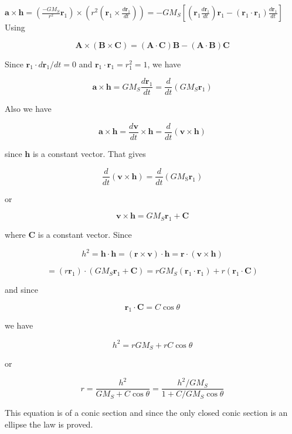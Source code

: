 \documentclass[10pt]{article}
\begin{document}
$\mathbf{a} \times \mathbf{h}=\left(\frac{-G M_{S}}{r^{2}} \mathbf{r}_{1}\right) \times\left(r^{2}\left(\mathbf{r}_{1} \times \frac{d \mathbf{r}_{1}}{d t}\right)\right)=-G M_{S}\left[\left(\mathbf{r}_{1} \frac{d \mathbf{r}_{1}}{d t}\right) \mathbf{r}_{1}-\left(\mathbf{r}_{1} \cdot \mathbf{r}_{1}\right) \frac{d \mathbf{r}_{1}}{d t}\right]$\\
Using

$$
\mathbf{A} \times(\mathbf{B} \times \mathbf{C})=(\mathbf{A} \cdot \mathbf{C}) \mathbf{B}-(\mathbf{A} \cdot \mathbf{B}) \mathbf{C}
$$

Since $\mathbf{r}_{1} \cdot d \mathbf{r}_{1} / d t=0$ and $\mathbf{r}_{1} \cdot \mathbf{r}_{1}=r_{1}^{2}=1$, we have

$$
\mathbf{a} \times \mathbf{h}=G M_{S} \frac{d \mathbf{r}_{1}}{d t}=\frac{d}{d t}\left(G M_{S} \mathbf{r}_{1}\right)
$$

Also we have

$$
\mathbf{a} \times \mathbf{h}=\frac{d \mathbf{v}}{d t} \times \mathbf{h}=\frac{d}{d t}(\mathbf{v} \times \mathbf{h})
$$

since $\mathbf{h}$ is a constant vector. That gives

$$
\frac{d}{d t}(\mathbf{v} \times \mathbf{h})=\frac{d}{d t}\left(G M_{\mathrm{S}} \mathbf{r}_{1}\right)
$$

or

$$
\mathbf{v} \times \mathbf{h}=G M_{S} \mathbf{r}_{1}+\mathbf{C}
$$

where $\mathbf{C}$ is a constant vector. Since

$$
h^{2}=\mathbf{h} \cdot \mathbf{h}=(\mathbf{r} \times \mathbf{v}) \cdot \mathbf{h}=\mathbf{r} \cdot(\mathbf{v} \times \mathbf{h})
$$

$$
=\left(r \mathbf{r}_{1}\right) \cdot\left(G M_{S} \mathbf{r}_{1}+\mathbf{C}\right)=r G M_{S}\left(\mathbf{r}_{1} \cdot \mathbf{r}_{1}\right)+r\left(\mathbf{r}_{1} \cdot \mathbf{C}\right)
$$

and since

$$
\mathbf{r}_{1} \cdot \mathbf{C}=C \cos \theta
$$

we have

$$
h^{2}=r G M_{S}+r C \cos \theta
$$

or

$$
r=\frac{h^{2}}{G M_{S}+C \cos \theta}=\frac{h^{2} / G M_{S}}{1+C / G M_{S} \cos \theta}
$$

This equation is of a conic section and since the only closed conic section is an ellipse the law is proved.
\end{document}
